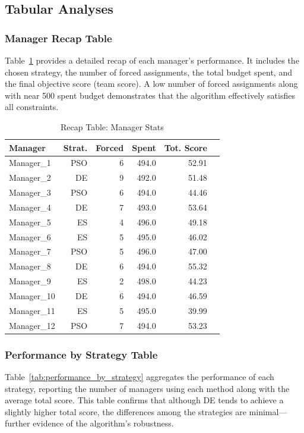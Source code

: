 \documentclass[sigconf]{acmart}
\begin{document}
	\subsection{Tabular Analyses}
	
	\subsubsection{Manager Recap Table}
	Table~\ref{tab:recap_manager} provides a detailed recap of each manager's performance. It includes the chosen strategy, the number of forced assignments, the total budget spent, and the final objective score (team score). A low number of forced assignments along with near 500 spent budget demonstrates that the algorithm effectively satisfies all constraints.
	
	\begin{table}[H]
		\centering
		\caption{Recap Table: Manager Stats}
		\label{tab:recap_manager}
		\begin{tabular}{lrrrrr}
			\toprule
			\textbf{Manager} & \textbf{Strat.} & \textbf{Forced} & \textbf{Spent} & \textbf{Tot. Score} \\
			\midrule
			Manager\_1  & PSO & 6 & 494.0 & 52.91 \\
			Manager\_2  & DE  & 9 & 492.0 & 51.48 \\
			Manager\_3  & PSO & 6 & 494.0 & 44.46 \\
			Manager\_4  & DE  & 7 & 493.0 & 53.64 \\
			Manager\_5  & ES  & 4 & 496.0 & 49.18 \\
			Manager\_6  & ES  & 5 & 495.0 & 46.02 \\
			Manager\_7  & PSO & 5 & 496.0 & 47.00 \\
			Manager\_8  & DE  & 6 & 494.0 & 55.32 \\
			Manager\_9  & ES  & 2 & 498.0 & 44.23 \\
			Manager\_10 & DE  & 6 & 494.0 & 46.59 \\
			Manager\_11 & ES  & 5 & 495.0 & 39.99 \\
			Manager\_12 & PSO & 7 & 494.0 & 53.23 \\
			\bottomrule
		\end{tabular}
	\end{table}
	
	\subsubsection{Performance by Strategy Table}
	Table~\ref{tab:performance_by_strategy} aggregates the performance of each strategy, reporting the number of managers using each method along with the average total score. This table confirms that although DE tends to achieve a slightly higher total score, the differences among the strategies are minimal—further evidence of the algorithm's robustness.
	
\end{document}
